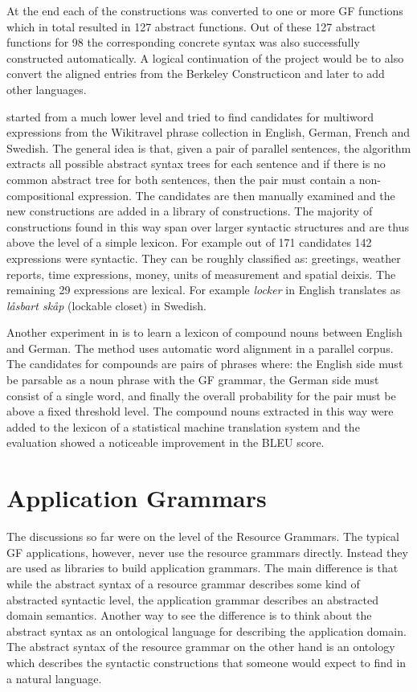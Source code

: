 \documentclass[output=paper]{LSP/langsci}
\begin{document}
At the end each of the constructions was converted to one or 
more GF functions which in total resulted in 127 abstract functions. 
Out of these 127 abstract functions for 98 the corresponding 
concrete syntax was also successfully constructed automatically.
A logical continuation of the project would be to also convert the
aligned entries from the Berkeley Constructicon and later
to add other languages.

\cite{enache2014handling} started from a much lower level and tried
to find candidates for multiword expressions from 
the Wikitravel phrase collection
in English, German, French and Swedish. The general idea is that,
given a pair of parallel sentences, the algorithm extracts all
possible abstract syntax trees for each sentence and if there
is no common abstract tree for both sentences, then the pair must
contain a non-compositional expression. The candidates are then
manually examined and the new constructions are added in a library
of constructions. The majority of constructions found in this way
span over larger syntactic structures and are thus above the level of
a simple lexicon. For example out of 171 candidates 142 expressions
were syntactic. They can be roughly classified as: greetings, weather
reports, time expressions, money, units of measurement and spatial deixis.
The remaining 29 expressions are lexical. For example \textit{locker}
in English translates as \textit{l{\aa}sbart sk{\aa}p} (lockable closet)
in Swedish.

Another experiment in \cite{enache2014handling} is to learn
a lexicon of compound nouns between English and German. The method
uses automatic word alignment in a parallel corpus. The candidates for
compounds are pairs of phrases where: the English side must be parsable
as a noun phrase with the GF grammar, the German side must consist
of a single word, and finally the overall probability for the pair must
be above a fixed threshold level. The compound nouns extracted in this
way were added to the lexicon of a statistical machine translation
system and the evaluation showed a noticeable improvement in the BLEU
score.

\section{Application Grammars}

The discussions so far were on the level of the Resource Grammars.
The typical GF applications, however, never use the resource grammars
directly. Instead they are used as libraries to build application grammars.
The main difference is that while the abstract syntax of a resource grammar
describes some kind of abstracted syntactic level, the application
grammar describes an abstracted domain semantics. Another way to see
the difference is to think about the abstract syntax as an ontological
language for describing the application domain. The abstract syntax
of the resource grammar on the other hand is an ontology which describes
the syntactic constructions that someone would expect to find in a natural
language.
\end{document}
